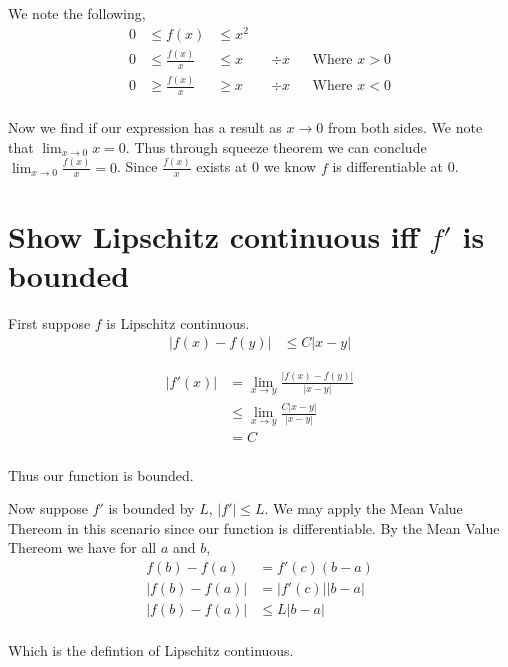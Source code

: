 \documentclass{article}
\begin{document}
We note the following,
\begin{align*}
    0 &\leq f(x) &\leq x^2 \\
    0 &\leq \frac{f(x)}{x} &\leq x && \div x && \text{Where $x > 0$} \\
    0 &\geq \frac{f(x)}{x} &\geq x && \div x && \text{Where $x < 0$} \\
\end{align*}

Now we find if our expression has a result as $x \to 0$ from both sides.
We note that $\lim_{x \to 0} x = 0$. Thus through squeeze theorem we can
conclude $\lim_{x \to 0} \frac{f(x)}{x} = 0$. Since $\frac{f(x)}{x}$ exists at
0 we know $f$ is differentiable at 0.

\section{Show Lipschitz continuous iff $f'$ is bounded}
First suppose $f$ is Lipschitz continuous.
\begin{align*}
    |f(x) - f(y)| &\leq C|x - y|
\end{align*}

\begin{align*}
    |f'(x)| &= \lim_{x \to y} \frac{|f(x) - f(y)|}{|x - y|} \\
    &\leq \lim_{x \to y} \frac{C|x - y|}{|x - y|} \\
    &= C \\
\end{align*}

Thus our function is bounded.

Now suppose $f'$ is bounded by $L$, $|f'| \leq L$.
We may apply the Mean Value Thereom in this scenario since our function is
differentiable. By the Mean Value Thereom we have for all $a$ and $b$,
\begin{align*}
    f(b) - f(a) &= f'(c)(b - a) \\
    |f(b) - f(a)| &= |f'(c)||b - a| \\
    |f(b) - f(a)| &\leq L|b - a| \\
\end{align*}

Which is the defintion of Lipschitz continuous.
\end{document}
